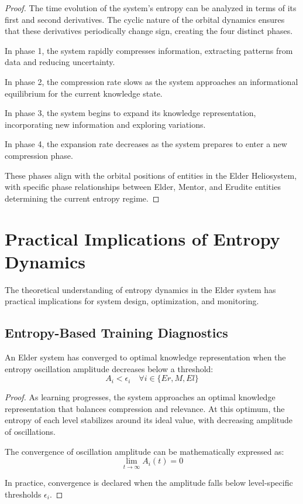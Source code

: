 \begin{proof}
The time evolution of the system's entropy can be analyzed in terms of its first and second derivatives. The cyclic nature of the orbital dynamics ensures that these derivatives periodically change sign, creating the four distinct phases.

In phase 1, the system rapidly compresses information, extracting patterns from data and reducing uncertainty.

In phase 2, the compression rate slows as the system approaches an informational equilibrium for the current knowledge state.

In phase 3, the system begins to expand its knowledge representation, incorporating new information and exploring variations.

In phase 4, the expansion rate decreases as the system prepares to enter a new compression phase.

These phases align with the orbital positions of entities in the Elder Heliosystem, with specific phase relationships between Elder, Mentor, and Erudite entities determining the current entropy regime.
\end{proof}

\section{Practical Implications of Entropy Dynamics}

The theoretical understanding of entropy dynamics in the Elder system has practical implications for system design, optimization, and monitoring.

\subsection{Entropy-Based Training Diagnostics}

\begin{theorem}
An Elder system has converged to optimal knowledge representation when the entropy oscillation amplitude decreases below a threshold:
\begin{equation}
A_i < \epsilon_i \quad \forall i \in \{Er, M, El\}
\end{equation}
\end{theorem}

\begin{proof}
As learning progresses, the system approaches an optimal knowledge representation that balances compression and relevance. At this optimum, the entropy of each level stabilizes around its ideal value, with decreasing amplitude of oscillations.

The convergence of oscillation amplitude can be mathematically expressed as:
\begin{equation}
\lim_{t \to \infty} A_i(t) = 0
\end{equation}

In practice, convergence is declared when the amplitude falls below level-specific thresholds $\epsilon_i$.
\end{proof}

